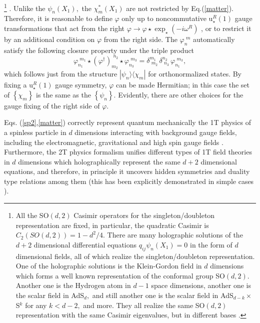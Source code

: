 \documentclass[a4paper,12pt]{article}
\begin{document}
\footnote{%
All the SO$\left( d,2\right) $ Casimir operators for the singleton/doubleton
representation are fixed, in particular, the quadratic Casimir is $%
C_{2}\left( SO\left( d,2\right) \right) =1-d^{2}/4$. There are many
holographic solutions of the $d+2$ dimensional differential equations $%
q_{ij}\psi _{n}\left( X_{1}\right) =0$ in the form of $d$ dimensional
fields, all of which realize the singleton/doubleton representation. One of
the holographic solutions is the Klein-Gordon field in $d$ dimensions which
forms a well known representation of the conformal group SO$\left(
d,2\right) .$ Another one is the Hydrogen atom in $d-1$ space dimensions,
another one is the scalar field in AdS$_{d},$ and still another one is the
scalar field in AdS$_{d-k}\times $S$^{k}$ for any $k<d-2,$ and more. They
all realize the same SO$\left( d,2\right) $ representation with the same
Casimir eigenvalues, but in different bases \cite{field2T}$.$} $.$ Unlike
the $\psi _{n}\left( X_{1}\right) ,$ the $\chi _{m}^{\ast }\left(
X_{1}\right) $ are not restricted by Eq.(\ref{matter}). Therefore, it is
reasonable to define $\varphi $ only up to noncommutative u$_{\star
}^{R}\left( 1\right) $ gauge transformations that act from the right $%
\varphi \rightarrow \varphi \star \exp _{\star }\left( -i\omega ^{R}\right) $%
, or to restrict it by an additional condition on $\varphi $ from the right
side. The $\varphi _{n}^{\,\,m}$ automatically satisfy the following closure
property under the triple product 
\begin{equation}
\varphi _{n_{1}}^{\,\,m_{1}}\star \left( \varphi ^{\dagger }\right)
_{m_{2}}^{\,\,n_{2}}\star \varphi _{n_{3}}^{\,\,m_{3}}=\delta
_{\,\,m_{2}}^{m_{1}}\,\delta _{\,\,n_{3}}^{n_{2}}\,\varphi
_{n_{1}}^{\,\,m_{3}},  \label{tripple}
\end{equation}
which follows just from the structure $|\psi _{n}\rangle \langle \chi _{m}|$
for orthonormalized states. By fixing a u$_{\star }^{R}\left( 1\right) $
gauge symmetry, $\varphi $ can be made Hermitian; in this case the set of $%
\left\{ \chi _{m}\right\} $ is the same as the $\left\{ \psi _{n}\right\} .$
Evidently, there are other choices for the gauge fixing of the right side of 
$\varphi $.

Eqs. (\ref{sp2},\ref{matter}) correctly represent quantum mechanically the
1T physics of a spinless particle in $d$ dimensions interacting with
background gauge fields, including the electromagnetic, gravitational and
high spin gauge fields \cite{NCSp}. Furthermore, the 2T physics formalism
unifies different types of 1T field theories in $d$ dimensions which
holographically represent the same $d+2$ dimensional equations, and
therefore, in principle it uncovers hidden symmetries and duality type
relations among them (this has been explicitly demonstrated in simple cases 
\cite{survey2T}).
\end{document}
